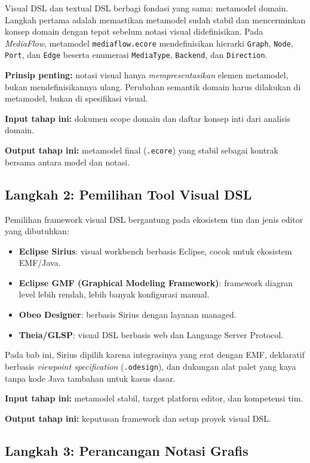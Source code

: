 Visual DSL dan textual DSL berbagi fondasi yang sama: metamodel domain. Langkah pertama adalah memastikan metamodel sudah stabil dan mencerminkan konsep domain dengan tepat sebelum notasi visual didefinisikan. Pada \textit{MediaFlow}, metamodel \texttt{mediaflow.ecore} mendefinisikan hierarki \texttt{Graph}, \texttt{Node}, \texttt{Port}, dan \texttt{Edge} beserta enumerasi \texttt{MediaType}, \texttt{Backend}, dan \texttt{Direction}.

\textbf{Prinsip penting:} notasi visual hanya \textit{mempresentasikan} elemen metamodel, bukan mendefinisikannya ulang. Perubahan semantik domain harus dilakukan di metamodel, bukan di spesifikasi visual.

\textbf{Input tahap ini:} dokumen scope domain dan daftar konsep inti dari analisis domain.

\textbf{Output tahap ini:} metamodel final (\texttt{.ecore}) yang stabil sebagai kontrak bersama antara model dan notasi.

\subsection{Langkah 2: Pemilihan Tool Visual DSL}

Pemilihan framework visual DSL bergantung pada ekosistem tim dan jenis editor yang dibutuhkan:
\begin{itemize}
  \item \textbf{Eclipse Sirius}: visual workbench berbasis Eclipse, cocok untuk ekosistem EMF/Java.
  \item \textbf{Eclipse GMF (Graphical Modeling Framework)}: framework diagran level lebih rendah, lebih banyak konfigurasi manual.
  \item \textbf{Obeo Designer}: berbasis Sirius dengan layanan managed.
  \item \textbf{Theia/GLSP}: visual DSL berbasis web dan Language Server Protocol.
\end{itemize}

Pada bab ini, Sirius dipilih karena integrasinya yang erat dengan EMF, deklaratif berbasis \textit{viewpoint specification} (\texttt{.odesign}), dan dukungan alat palet yang kaya tanpa kode Java tambahan untuk kasus dasar.

\textbf{Input tahap ini:} metamodel stabil, target platform editor, dan kompetensi tim.

\textbf{Output tahap ini:} keputusan framework dan setup proyek visual DSL.

\subsection{Langkah 3: Perancangan Notasi Grafis}

